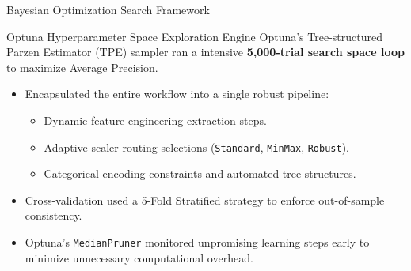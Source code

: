 \begin{frame}{Bayesian Optimization Search Framework}
\begin{block}{Optuna Hyperparameter Space Exploration Engine}
Optuna's Tree-structured Parzen Estimator (TPE) sampler ran a intensive \textbf{5,000-trial search space loop} to maximize Average Precision.
\end{block}
\begin{itemize}
    \item Encapsulated the entire workflow into a single robust pipeline:
    \begin{itemize}
        \item Dynamic feature engineering extraction steps.
        \item Adaptive scaler routing selections (\texttt{Standard}, \texttt{MinMax}, \texttt{Robust}).
        \item Categorical encoding constraints and automated tree structures.
    \end{itemize}
    \item Cross-validation used a 5-Fold Stratified strategy to enforce out-of-sample consistency.
    \item Optuna's \texttt{MedianPruner} monitored unpromising learning steps early to minimize unnecessary computational overhead.
\end{itemize}
\end{frame}



